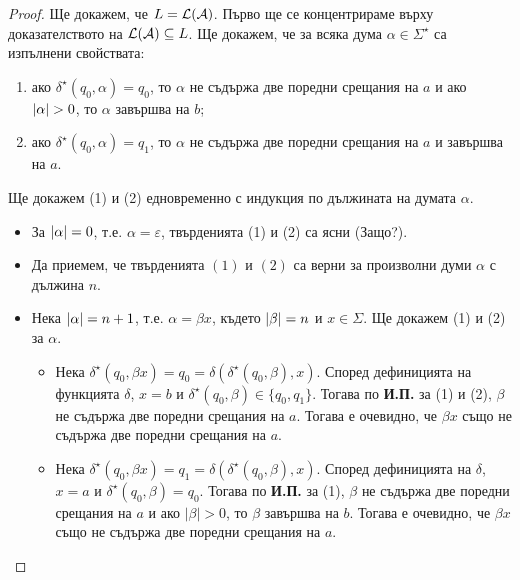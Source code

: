 \begin{proof}
  Ще докажем, че $L = \mathcal{L}(\mathcal{A})$.
  Първо ще се концентрираме върху доказателството на $\mathcal{L}(\mathcal{A}) \subseteq L$.
  Ще докажем, че за всяка дума $\alpha \in \Sigma^\star$ са изпълнени свойствата:
  \begin{enumerate}[(1)]
  \item 
    ако $\delta^\star(q_0,\alpha) = q_0$, то
    $\alpha$ не съдържа две поредни срещания на $a$
    и ако $\vert{\alpha}\vert > 0$, то $\alpha$ завършва на $b$;
  \item
    ако $\delta^\star(q_0,\alpha) = q_1$, то
    $\alpha$ не съдържа две поредни срещания на $a$
    и завършва на $a$.
  \end{enumerate}
  Ще докажем (1) и (2) едновременно с индукция по дължината на думата $\alpha$.  
  \begin{itemize}
  \item
    За $\vert{\alpha}\vert = 0$, т.е. $\alpha = \varepsilon$, твърденията (1) и (2) са ясни (Защо?).
  \item
    Да приемем, че твърденията $(1)$ и $(2)$ са верни за произволни думи $\alpha$ с дължина $n$.
  \item
    Нека $\vert{\alpha}\vert = n+1$, т.е. $\alpha = \beta x$, където $\vert{\beta}\vert = n$ и $x \in \Sigma$.
    Ще докажем (1) и (2) за $\alpha$.
    \begin{itemize}[-]
    \item 
      Нека $\delta^\star(q_0,\beta x) = q_0 = \delta(\delta^\star(q_0,\beta),x)$.
      Според дефиницията на функцията $\delta$, $x = b$ и $\delta^\star(q_0,\beta) \in \{q_0,q_1\}$.
      Тогава по {\bf И.П.} за (1) и (2), $\beta$ не съдържа две поредни срещания на $a$.
      Тогава е очевидно, че $\beta x$ също не съдържа две поредни срещания на $a$.
    \item
      Нека $\delta^\star(q_0,\beta x) = q_1 = \delta(\delta^\star(q_0,\beta),x)$.
      Според дефиницията на $\delta$, $x = a$ и $\delta^\star(q_0,\beta) = q_0$.
      Тогава по {\bf И.П.} за (1), $\beta$ не съдържа две поредни срещания на $a$ и ако $|\beta| > 0$, то $\beta$ завършва на $b$.
      Тогава е очевидно, че $\beta x$ също не съдържа две поредни срещания на $a$.
    \end{itemize}
  \end{itemize}
  

\end{proof}
